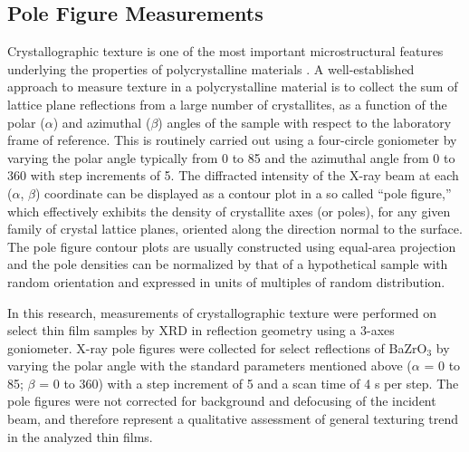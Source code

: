 \vspace{12pt}
\subsection{Pole Figure Measurements}
Crystallographic texture is one of the most important microstructural features underlying the properties of polycrystalline materials \cite{Kocks2000}. A well-established approach to measure texture in a polycrystalline material is to collect the sum of lattice plane reflections from a large number of crystallites, as a function of the polar ($\alpha$) and azimuthal ($\beta$)  angles of the sample with respect to the laboratory frame of reference. This is routinely carried out using a four-circle goniometer \cite{Kocks2000} by varying the polar angle typically from 0\textdegree{} to 85\textdegree{} and the azimuthal angle from 0\textdegree{} to 360\textdegree{} with step increments of 5\textdegree. The diffracted intensity of the X-ray beam at each ($\alpha$, $\beta$) coordinate can be displayed as a contour plot in a so called ``pole figure,'' which effectively exhibits the density of crystallite axes (or poles), for any given family of crystal lattice planes, oriented along the direction normal to the surface.   
The pole figure contour plots are usually constructed using equal-area projection and the pole densities can be normalized by that of a hypothetical sample with random orientation and expressed in units of multiples of random distribution.

In this research, measurements of crystallographic texture were performed on select thin film samples by XRD in reflection geometry using a 3-axes goniometer. X-ray pole figures were collected for select reflections of BaZrO$_3$ by varying the polar angle with the standard parameters mentioned above ($\alpha$ = 0\textdegree{} to 85\textdegree{}; $\beta$ = 0\textdegree{} to 360\textdegree{}) with a step increment of 5\textdegree{} and a scan time of 4 s per step. The pole figures were not corrected for background and defocusing of the incident beam, and therefore represent a qualitative assessment of general texturing trend in the analyzed thin films.
